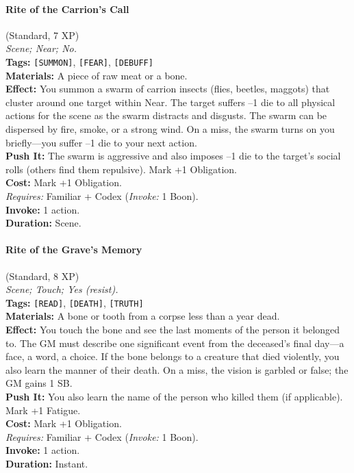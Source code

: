 \paragraph{Rite of the Carrion's Call} (Standard, 7 XP) \hfill \\
\emph{Scene; Near; No.} \\
\textbf{Tags:} \texttt{[SUMMON]}, \texttt{[FEAR]}, \texttt{[DEBUFF]} \\
\textbf{Materials:} A piece of raw meat or a bone. \\
\textbf{Effect:} You summon a swarm of carrion insects (flies, beetles, maggots) that cluster around one target within Near. The target suffers --1 die to all physical actions for the scene as the swarm distracts and disgusts. The swarm can be dispersed by fire, smoke, or a strong wind. On a miss, the swarm turns on you briefly---you suffer --1 die to your next action. \\
\textbf{Push It:} The swarm is aggressive and also imposes --1 die to the target's social rolls (others find them repulsive). Mark +1 Obligation. \\
\textbf{Cost:} Mark +1 Obligation. \\
\textit{Requires:} Familiar + Codex (\textit{Invoke:} 1 Boon). \\
\textbf{Invoke:} 1 action. \\
\textbf{Duration:} Scene.

\paragraph{Rite of the Grave's Memory} (Standard, 8 XP) \hfill \\
\emph{Scene; Touch; Yes (resist).} \\
\textbf{Tags:} \texttt{[READ]}, \texttt{[DEATH]}, \texttt{[TRUTH]} \\
\textbf{Materials:} A bone or tooth from a corpse less than a year dead. \\
\textbf{Effect:} You touch the bone and see the last moments of the person it belonged to. The GM must describe one significant event from the deceased's final day---a face, a word, a choice. If the bone belongs to a creature that died violently, you also learn the manner of their death. On a miss, the vision is garbled or false; the GM gains 1 SB. \\
\textbf{Push It:} You also learn the name of the person who killed them (if applicable). Mark +1 Fatigue. \\
\textbf{Cost:} Mark +1 Obligation. \\
\textit{Requires:} Familiar + Codex (\textit{Invoke:} 1 Boon). \\
\textbf{Invoke:} 1 action. \\
\textbf{Duration:} Instant.

